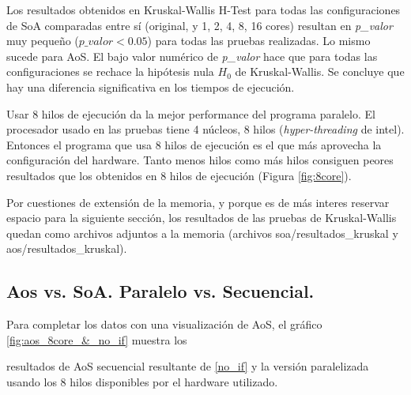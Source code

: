 \documentclass{article}
\begin{document}
Los resultados obtenidos en Kruskal-Wallis H-Test para todas las configuraciones de SoA comparadas entre sí
(original, y 1, 2, 4, 8, 16 cores) resultan en \textit{p\_valor} muy pequeño (${p\_valor} < 0.05$) para todas
las pruebas realizadas. Lo mismo sucede para AoS. El bajo valor numérico de \textit{p\_valor} hace que para todas las configuraciones se rechace
la hipótesis nula ${H_0}$ de Kruskal-Wallis. Se concluye que hay una diferencia significativa
en los tiempos de ejecución.

Usar 8 hilos de ejecución da la mejor performance del programa paralelo. El procesador
usado en las pruebas tiene 4 núcleos, 8 hilos (\textit{hyper-threading} de intel).
Entonces el programa que usa 8 hilos de ejecución es el que más aprovecha la configuración del hardware.
Tanto menos hilos como más hilos consiguen peores resultados que los obtenidos en 8 hilos de ejecución (Figura \ref{fig:8core}).

Por cuestiones de extensión de la memoria, y porque es de más interes reservar espacio
para la siguiente sección, los resultados de las pruebas de Kruskal-Wallis quedan como archivos adjuntos a la memoria (archivos soa/resultados\_kruskal
y aos/resultados\_kruskal).

\subsection{Aos vs. SoA. Paralelo vs. Secuencial.\label{t-test}}
Para completar los datos con una visualización de AoS, el gráfico \ref{fig:aos_8core_&_no_if} muestra los

resultados de AoS secuencial resultante de \ref{no_if} y la versión paralelizada usando los 8 hilos disponibles
por el hardware utilizado.
\end{document}

